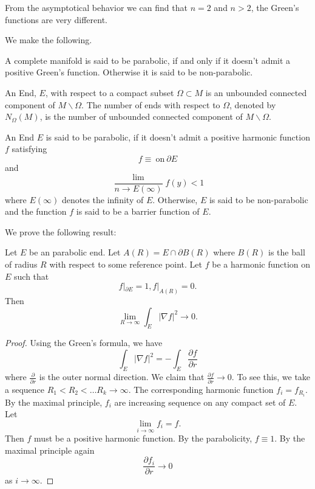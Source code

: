 From the asymptotical behavior we can find that $ n = 2$ and $ n> 2$, the Green's functions are very different.

We make the following.

\begin{definition} A complete manifold is said to be parabolic, if and only if it doesn't admit a positive Green's function. Otherwise it is said to be non-parabolic.
\end{definition}

\begin{definition}
An End, $E$, with respect to a compact subset $ \Omega \subset M  $ is an unbounded connected  component of $ M \backslash \Omega $. The number of ends with respect to $ \Omega $, denoted by $ N_{\Omega}(M)$, is the number of unbounded connected component of $ M \backslash \Omega $.
\end{definition}

\begin{definition} An End $E$ is said to be parabolic, if it doesn't admit a positive harmonic function $f$ satisfying 
%
\[ f \equiv  \ \mbox{on} \ \partial E\]
and
\[ \frac{\lim}{n\rightarrow E (\infty)} f(y) <  1 \]
where $ E(\infty)$ denotes the infinity of $E$. Otherwise, $E$ is said to be non-parabolic and the function $f$ is said to be a barrier function of $E$.

We prove the following result:
\end{definition}

\begin{theorem} Let $E$ be an parabolic end. Let $ A(R) = E \cap \partial B(R) $ where $ B(R)$ is the ball of radius $R$ with respect to some reference point. Let $f$ be a harmonic function on $E$ such that 
%
\[ f|_{\partial E} = 1 , f | _{A(R) } = 0 .\]
%
Then 
%
\[ \lim_{R\rightarrow \infty} \int_E |\nabla f|^2 \rightarrow 0. \]
\end{theorem}

\begin{proof}
Using the Green's formula, we have 
%
\[\int _E |\nabla f|^2 = - \int _E \frac{\partial f}{\partial r}  \]
%
where $\frac{\partial }{\partial r} $ is the outer  normal direction. We claim that $ \frac{\partial f}{\partial r} \rightarrow 0$.
To see this, we take a sequence $ R_1 < R_2 < \ldots R_k \rightarrow \infty$. The corresponding harmonic function $f_i = f_{R_{i}}$. By the maximal principle, $f_i$ are increasing sequence on any compact set of $E$. Let 
%
\[ \lim_{i \rightarrow \infty} f_i = f. \]
%
Then $f$ must be a positive harmonic function. By the parabolicity, $f \equiv 1$. By the maximal principle again 
%
\[ \frac{\partial f_i}{\partial r} \rightarrow 0\]
%
as $ i \rightarrow \infty$.
\end{proof}

